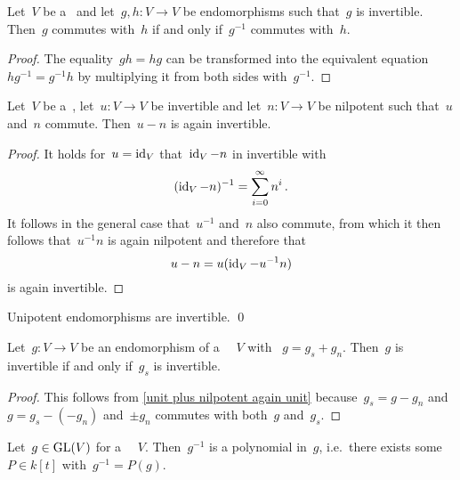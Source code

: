 \begin{lemma}
  Let~$V$ be a~ and let~$g, h \colon V \to V$ be endomorphisms such that~$g$ is invertible.
  Then~$g$ commutes with~$h$ if and only if~$g^{-1}$ commutes with~$h$.
\end{lemma}


\begin{proof}
  The equality~$g h = h g$ can be transformed into the equivalent equation~$h g^{-1} = g^{-1} h$ by multiplying it from both sides with~$g^{-1}$.
\end{proof}


\begin{lemma}
  \label{unit plus nilpotent again unit}
  Let~$V$ be a~, let~$u \colon V \to V$ be invertible and let~$n \colon V \to V$ be nilpotent such that~$u$ and~$n$ commute.
  Then~$u - n$ is again invertible.
\end{lemma}


\begin{proof}
  It holds for~$u = \operatorname{id}_V$ that~$\operatorname{id}_V - n$ in invertible with
  \[
      (\operatorname{id}_V - n)^{-1}
    = \sum_{i=0}^\infty n^i \,.
  \]
  It follows in the general case that~$u^{-1}$ and~$n$ also commute, from which it then follows that~$u^{-1} n$ is again nilpotent and therefore that
  \[
      u - n
    = u (\operatorname{id}_V - u^{-1} n)
  \]
  is again invertible.
\end{proof}


\begin{corollary}
  Unipotent endomorphisms are invertible.
  \qed
\end{corollary}


\begin{corollary}
  \label{invertible iff ss part fd}
  Let~$g \colon V \to V$ be an endomorphism of a ~~$V$ with {\JCD}~$g = g_s + g_n$.
  Then~$g$ is invertible if and only if~$g_s$ is invertible.
\end{corollary}


\begin{proof}
  This follows from \cref{unit plus nilpotent again unit} because~$g_s = g - g_n$ and~$g = g_s - (-g_n)$ and~$\pm g_n$ commutes with both~$g$ and~$g_s$.
\end{proof}


\begin{lemma}
  Let~$g \in \operatorname{GL}(V)$ for a ~~$V$.
  Then~$g^{-1}$ is a polynomial in~$g$, i.e.\ there exists some~$P \in k[t]$ with~$g^{-1} = P(g)$.
\end{lemma}



